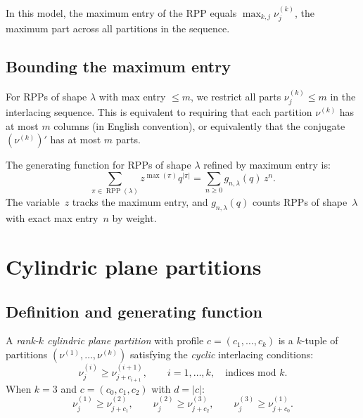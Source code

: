 \documentclass[11pt]{article}
\newcommand{\RPP}{\operatorname{RPP}}
\begin{document}
In this model, the maximum entry of the RPP equals
$\max_{k,j} \nu^{(k)}_j$, the maximum part across all
partitions in the sequence.

\subsection{Bounding the maximum entry}
\label{sec:rpp-bounded}

For RPPs of shape $\lambda$ with max entry $\leq m$, we
restrict all parts $\nu^{(k)}_j \leq m$ in the interlacing
sequence. This is equivalent to requiring that each partition
$\nu^{(k)}$ has at most $m$ columns (in English convention),
or equivalently that the conjugate $(\nu^{(k)})'$ has at most
$m$ parts.

The generating function for RPPs of shape $\lambda$ refined
by maximum entry is:
\begin{equation}\label{eq:rpp-max-gf}
  \sum_{\pi \in \RPP(\lambda)} z^{\max(\pi)} q^{|\pi|}
  = \sum_{n \geq 0} g_{n,\lambda}(q)\, z^n.
\end{equation}
The variable~$z$ tracks the maximum entry, and
$g_{n,\lambda}(q)$ counts RPPs of shape~$\lambda$ with exact
max entry~$n$ by weight.

\section{Cylindric plane partitions}
\label{sec:cpp}

\subsection{Definition and generating function}

A \emph{rank-$k$ cylindric plane partition} with profile
$c = (c_1, \ldots, c_k)$ is a $k$-tuple of partitions
$(\nu^{(1)}, \ldots, \nu^{(k)})$ satisfying the
\emph{cyclic} interlacing conditions:
\begin{equation}\label{eq:cpp-interlacing}
  \nu^{(i)}_j \geq \nu^{(i+1)}_{j + c_{i+1}},
  \qquad i = 1, \ldots, k,
  \quad \text{indices mod $k$}.
\end{equation}
When $k = 3$ and $c = (c_0, c_1, c_2)$ with $d = |c|$:
\[
  \nu^{(1)}_j \geq \nu^{(2)}_{j+c_1}, \qquad
  \nu^{(2)}_j \geq \nu^{(3)}_{j+c_2}, \qquad
  \nu^{(3)}_j \geq \nu^{(1)}_{j+c_0}.
\]
\end{document}
